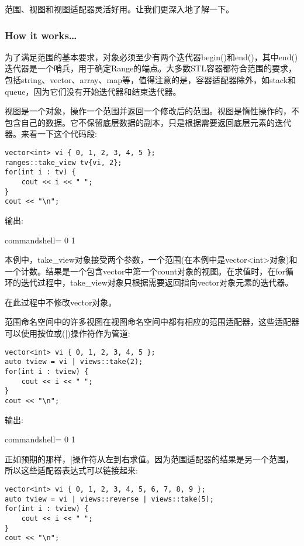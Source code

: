 范围、视图和视图适配器灵活好用。让我们更深入地了解一下。

\subsubsection{How it works…}

为了满足范围的基本要求，对象必须至少有两个迭代器begin()和end()，其中end()迭代器是一个哨兵，用于确定Range的端点。大多数STL容器都符合范围的要求，包括string、vector、array、map等，值得注意的是，容器适配器除外，如stack和queue，因为它们没有开始迭代器和结束迭代器。

视图是一个对象，操作一个范围并返回一个修改后的范围。视图是惰性操作的，不包含自己的数据。它不保留底层数据的副本，只是根据需要返回底层元素的迭代器。来看一下这个代码段:

\begin{lstlisting}[style=styleCXX]
vector<int> vi { 0, 1, 2, 3, 4, 5 };
ranges::take_view tv{vi, 2};
for(int i : tv) {
	cout << i << " ";
}
cout << "\n";
\end{lstlisting}

输出:

\begin{tcblisting}{commandshell={}}
0 1
\end{tcblisting}

本例中，take\_view对象接受两个参数，一个范围(在本例中是vector<int>对象)和一个计数。结果是一个包含vector中第一个count对象的视图。在求值时，在for循环的迭代过程中，take\_view对象只根据需要返回指向vector对象元素的迭代器。

在此过程中不修改vector对象。

范围命名空间中的许多视图在视图命名空间中都有相应的范围适配器，这些适配器可以使用按位或(|)操作符作为管道:

\begin{lstlisting}[style=styleCXX]
vector<int> vi { 0, 1, 2, 3, 4, 5 };
auto tview = vi | views::take(2);
for(int i : tview) {
	cout << i << " ";
}
cout << "\n";
\end{lstlisting}

输出:

\begin{tcblisting}{commandshell={}}
0 1
\end{tcblisting}

正如预期的那样，|操作符从左到右求值。因为范围适配器的结果是另一个范围，所以这些适配器表达式可以链接起来:

\begin{lstlisting}[style=styleCXX]
vector<int> vi { 0, 1, 2, 3, 4, 5, 6, 7, 8, 9 };
auto tview = vi | views::reverse | views::take(5);
for(int i : tview) {
	cout << i << " ";
}
cout << "\n";
\end{lstlisting}

